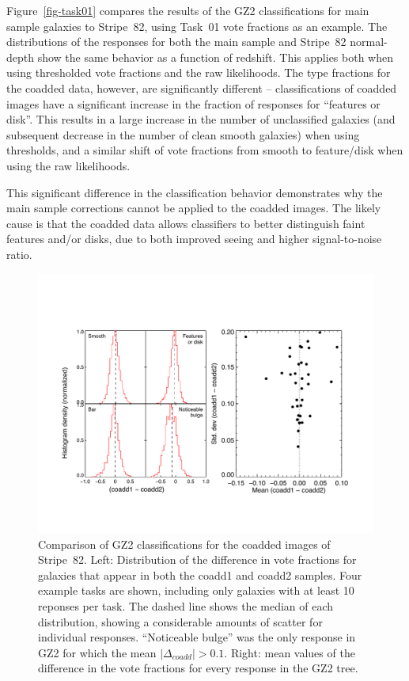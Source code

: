 \documentclass[useAMS,usenatbib]{mn2e}
\begin{document}
Figure~\ref{fig-task01} compares the results of the GZ2 classifications for main sample galaxies to Stripe~82, using Task~01 vote fractions as an example. The distributions of the responses for both the main sample and Stripe~82 normal-depth show the same behavior as a function of redshift. This applies both when using thresholded vote fractions and the raw likelihoods. The type fractions for the coadded data, however, are significantly different -- classifications of coadded images have a significant increase in the fraction of responses for ``features or disk''. This results in a large increase in the number of unclassified galaxies (and subsequent decrease in the number of clean smooth galaxies) when using thresholds, and a similar shift of vote fractions from smooth to feature/disk when using the raw likelihoods. 

This significant difference in the classification behavior demonstrates why the main sample corrections cannot be applied to the coadded images. The likely cause is that the coadded data allows classifiers to better distinguish faint features and/or disks, due to both improved seeing \citep[from $1.4\arcsec$ to $1.1\arcsec$;][]{ann11} and higher signal-to-noise ratio.

\begin{figure}
\includegraphics[angle=0,width=7.0in]{figures/stripe82_coadd_compare.pdf}
\caption{Comparison of GZ2 classifications for the coadded images of Stripe~82. Left: Distribution of the difference in vote fractions for galaxies that appear in both the coadd1 and coadd2 samples. Four example tasks are shown, including only galaxies with at least 10 reponses per task. The dashed line shows the median of each distribution, showing a considerable amounts of scatter for individual responses. ``Noticeable bulge'' was the only response in GZ2 for which the mean $|\Delta_{coadd}| > 0.1$. Right: mean values of the difference in the vote fractions for every response in the GZ2 tree. 
\label{fig-stripe82_compare}}
\end{figure}
\end{document}
